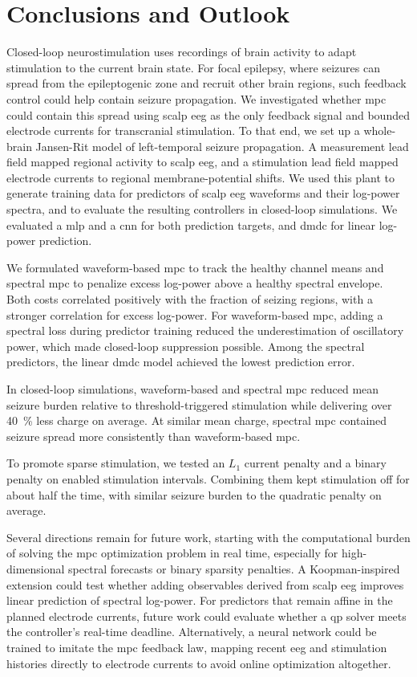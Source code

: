 \chapter{Conclusions and Outlook}\label{ch:conclusion_and_future_outlook}

Closed-loop neurostimulation uses recordings of brain activity to adapt stimulation to the current brain state.
For focal epilepsy, where seizures can spread from the epileptogenic zone and recruit other brain regions, such feedback control could help contain seizure propagation.
We investigated whether \ac{mpc} could contain this spread using scalp \ac{eeg} as the only feedback signal and bounded electrode currents for transcranial stimulation.
To that end, we set up a whole-brain Jansen-Rit model of left-temporal seizure propagation.
A measurement lead field mapped regional activity to scalp \ac{eeg}, and a stimulation lead field mapped electrode currents to regional membrane-potential shifts.
We used this plant to generate training data for predictors of scalp \ac{eeg} waveforms and their log-power spectra, and to evaluate the resulting controllers in closed-loop simulations.
We evaluated a \acf{mlp} and a \acf{cnn} for both prediction targets, and \acf{dmdc} for linear log-power prediction.

We formulated waveform-based \ac{mpc} to track the healthy channel means and spectral \ac{mpc} to penalize excess log-power above a healthy spectral envelope.
Both costs correlated positively with the fraction of seizing regions, with a stronger correlation for excess log-power.
For waveform-based \ac{mpc}, adding a spectral loss during predictor training reduced the underestimation of oscillatory power, which made closed-loop suppression possible.
Among the spectral predictors, the linear \ac{dmdc} model achieved the lowest prediction error.

In closed-loop simulations, waveform-based and spectral \ac{mpc} reduced mean seizure burden relative to threshold-triggered stimulation while delivering over \SI{40}{\percent} less charge on average.
At similar mean charge, spectral \ac{mpc} contained seizure spread more consistently than waveform-based \ac{mpc}.

To promote sparse stimulation, we tested an \(L_1\) current penalty and a binary penalty on enabled stimulation intervals.
Combining them kept stimulation off for about half the time, with similar seizure burden to the quadratic penalty on average.

Several directions remain for future work, starting with the computational burden of solving the \ac{mpc} optimization problem in real time, especially for high-dimensional spectral forecasts or binary sparsity penalties.
A Koopman-inspired extension could test whether adding observables derived from scalp \ac{eeg} improves linear prediction of spectral log-power.
For predictors that remain affine in the planned electrode currents, future work could evaluate whether a \ac{qp} solver meets the controller's real-time deadline.
Alternatively, a neural network could be trained to imitate the \ac{mpc} feedback law, mapping recent \ac{eeg} and stimulation histories directly to electrode currents to avoid online optimization altogether.

